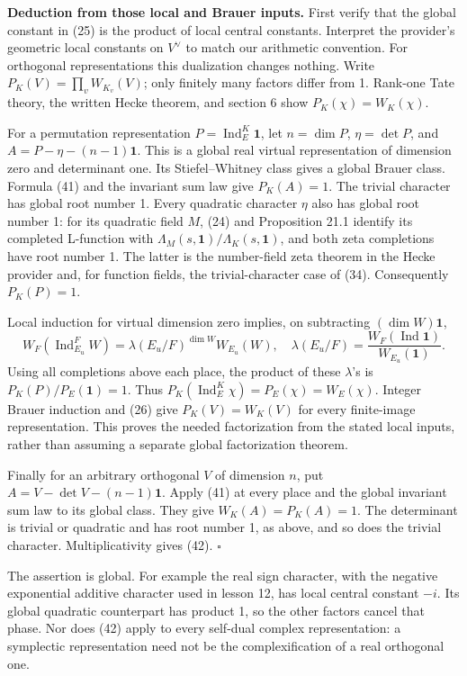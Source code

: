 \documentclass[11pt,a4paper]{article}
\begin{document}
\textbf{Deduction from those local and Brauer inputs.} First verify that
the global constant in (25) is the product of local central constants.
Interpret the provider's geometric local constants on \(V^\vee\) to
match our arithmetic convention. For orthogonal representations this
dualization changes nothing. Write \(P_K(V)=\prod_v W_{K_v}(V)\); only
finitely many factors differ from 1. Rank-one Tate theory, the written
Hecke theorem, and section 6 show \(P_K(\chi)=W_K(\chi)\).

For a permutation representation \(P=\operatorname{Ind}_E^K\mathbf1\),
let \(n=\dim P\), \(\eta=\det P\), and \(A=P-\eta-(n-1)\mathbf1\). This
is a global real virtual representation of dimension zero and
determinant one. Its Stiefel--Whitney class gives a global Brauer class.
Formula (41) and the invariant sum law give \(P_K(A)=1\). The trivial
character has global root number 1. Every quadratic character \(\eta\)
also has global root number 1: for its quadratic field \(M\), (24) and
Proposition 21.1 identify its completed L-function with
\(\Lambda_M(s,\mathbf1)/\Lambda_K(s,\mathbf1)\), and both zeta
completions have root number 1. The latter is the number-field zeta
theorem in the Hecke provider and, for function fields, the
trivial-character case of (34). Consequently \(P_K(P)=1\).

Local induction for virtual dimension zero implies, on subtracting
\((\dim W)\mathbf1\), \[
W_F(\operatorname{Ind}_{E_u}^F W)
=\lambda(E_u/F)^{\dim W}W_{E_u}(W),\quad
\lambda(E_u/F)=\frac{W_F(\operatorname{Ind}\mathbf1)}{W_{E_u}(\mathbf1)}.
\tag{43}
\] Using all completions above each place, the product of these
\(\lambda\)'s is \(P_K(P)/P_E(\mathbf1)=1\). Thus
\(P_K(\operatorname{Ind}_E^K\chi)=P_E(\chi)=W_E(\chi)\). Integer Brauer
induction and (26) give \(P_K(V)=W_K(V)\) for every finite-image
representation. This proves the needed factorization from the stated
local inputs, rather than assuming a separate global factorization
theorem.

Finally for an arbitrary orthogonal \(V\) of dimension \(n\), put
\(A=V-\det V-(n-1)\mathbf1\). Apply (41) at every place and the global
invariant sum law to its global class. They give \(W_K(A)=P_K(A)=1\).
The determinant is trivial or quadratic and has root number 1, as above,
and so does the trivial character. Multiplicativity gives (42).
\(\square\)

The assertion is global. For example the real sign character, with the
negative exponential additive character used in lesson 12, has local
central constant \(-i\). Its global quadratic counterpart has product 1,
so the other factors cancel that phase. Nor does (42) apply to every
self-dual complex representation: a symplectic representation need not
be the complexification of a real orthogonal one.
\end{document}
